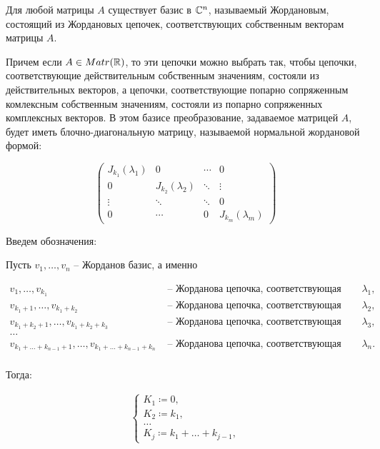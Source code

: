 \Thbd Для любой матрицы $A$ существует базис в $\mathbb{C}^n$, называемый Жордановым, состоящий из Жордановых цепочек, соответствующих собственным векторам матрицы $A$.

Причем если $A \in Matr(\mathbb{R})$, то эти цепочки можно выбрать так, чтобы цепочки, соответствующие действительным собственным значениям, состояли из действительных векторов, а цепочки, соответствующие попарно сопряженным комлексным собственным значениям, состояли из попарно сопряженных комплексных векторов.
В этом базисе преобразование, задаваемое матрицей $A$, будет иметь блочно-диагональную матрицу, называемой нормальной жордановой формой:

\begin{equation*}
    \begin{pmatrix}
          J_{k_1}(\lambda_1) & 0 & \cdots & 0\\[4pt]
          0 & J_{k_2}(\lambda_2) & \ddots & \vdots\\[4pt]
          \vdots & \ddots & \ddots & 0\\[4pt]
          0 & \cdots & 0 & J_{k_m}(\lambda_m)
    \end{pmatrix}
\end{equation*}

Введем обозначения:

Пусть $v_1, \dots, v_n$ -- Жорданов базис, а именно

\begin{align*}
    v_1, \dots, v_{k_1} &\text{ -- Жорданова цепочка, соответствующая собственному значению } \lambda_1, \\
    v_{k_1+1}, \dots, v_{k_1+k_2} &\text{ -- Жорданова цепочка, соответствующая собственному значению } \lambda_2, \\
    v_{k_1+k_2+1}, \dots, v_{k_1+k_2+k_3} &\text{ -- Жорданова цепочка, соответствующая собственному значению } \lambda_3, \\
    \dots \\
    v_{k_1+\dots+k_{n-1}+1}, \dots, v_{k_1+\dots+k_{n-1}+k_n} &\text{ -- Жорданова цепочка, соответствующая собственному значению } \lambda_n. \\
\end{align*}

Тогда:

\begin{align*}
    \begin{cases}
        K_1 \coloneqq 0, \\
        K_2 \coloneqq k_1, \\
        \dots \\
        K_j \coloneqq k_1 + \dots + k_{j-1},
    \end{cases}
\end{align*}

